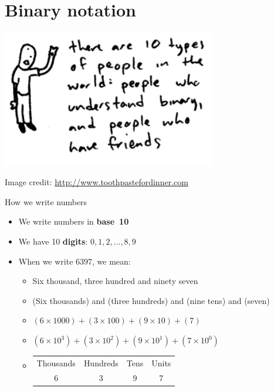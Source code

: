 \part{Binary notation}
\frame{\partpage}

\begin{frame}
	\centering
	\includegraphics[width=0.7\textwidth]{10-types-of-people}
	\par\vspace{2ex}\par
	{\tiny Image credit: \url{http://www.toothpastefordinner.com}}
\end{frame}



\begin{frame}{How we write numbers}
	\begin{itemize}
		\pause\item We write numbers in \textbf{base~10}
		\pause\item We have 10 \textbf{digits}: $0, 1, 2, \dots, 8, 9$
		\pause\item When we write $6397$, we mean:
			\begin{itemize}
				\pause\item Six thousand, three hundred and ninety seven
				\pause\item (Six thousands) and (three hundreds) and (nine tens) and (seven)
				\pause\item $(6 \times 1000) + (3 \times 100) + (9 \times 10) + (7)$
				\pause\item $\left(6 \times 10^3\right)
				+ \left(3 \times 10^2\right)
				+ \left(9 \times 10^1\right)
				+ \left(7 \times 10^0\right)$
				\pause\item
				    \begin{tabular}{cccc}
				        Thousands & Hundreds & Tens & Units \\
				        6 & 3 & 9 & 7
				    \end{tabular}
			\end{itemize}
	\end{itemize}
\end{frame}

